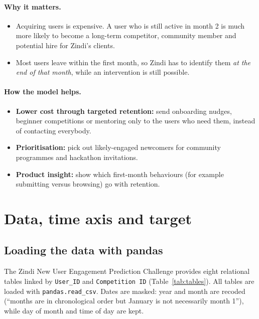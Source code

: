 \documentclass[11pt,a4paper]{article}
\newcommand{\code}[1]{\texttt{#1}}
\begin{document}
\paragraph{Why it matters.}
\begin{itemize}
  \item Acquiring users is expensive. A user who is still active in month 2 is much more likely to become a long-term competitor, community member and potential hire for Zindi's clients.
  \item Most users leave within the first month, so Zindi has to identify them \emph{at the end of that month}, while an intervention is still possible.
\end{itemize}

\paragraph{How the model helps.}
\begin{itemize}
  \item \textbf{Lower cost through targeted retention:} send onboarding nudges, beginner competitions or mentoring only to the users who need them, instead of contacting everybody.
  \item \textbf{Prioritisation:} pick out likely-engaged newcomers for community programmes and hackathon invitations.
  \item \textbf{Product insight:} show which first-month behaviours (for example submitting versus browsing) go with retention.
\end{itemize}

\section{Data, time axis and target}\label{sec:data}

\subsection{Loading the data with pandas}
The Zindi New User Engagement Prediction Challenge provides eight relational tables linked by \code{User\_ID} and \code{Competition ID}
(Table~\ref{tab:tables}). All tables are loaded with \code{pandas.read\_csv}. Dates are masked: year and month are recoded
(``months are in chronological order but January is not necessarily month 1''), while day of month and time of day are kept.
\end{document}
